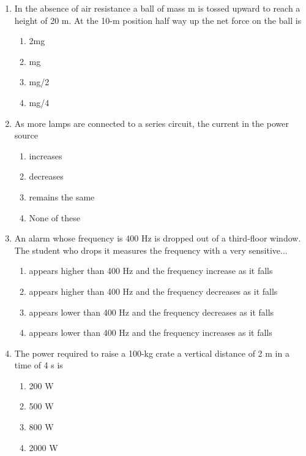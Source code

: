 \documentclass[12pt]{article}
\begin{document}
\begin{enumerate}[label=\arabic*.]
\begin{enumerate}[label=(\alph*)]
    \item frequency does not change, the wavelength decreases, and the speed decreases
    \item frequency does not change, the wavelength increases, and the speed decreases
\end{enumerate}
\item In the absence of air resistance a ball of mass m is tossed upward to reach a height of 20 m. At the 10-m position half way up the net force on the ball is
\begin{enumerate}[label=(\alph*)]
    \item 2mg
    \item mg
    \item mg/2
    \item mg/4
\end{enumerate}
\item As more lamps are connected to a series circuit, the current in the power source
\begin{enumerate}[label=(\alph*)]
    \item increases
    \item decreases
    \item remains the same
    \item None of these
\end{enumerate}
\item An alarm whose frequency is 400 Hz is dropped out of a third-floor window. The student who drops it measures the frequency with a very sensitive...
\begin{enumerate}[label=(\alph*)]
    \item appears higher than 400 Hz and the frequency increase as it falls
    \item appears higher than 400 Hz and the frequency decreases as it falls
    \item appears lower than 400 Hz and the frequency decreases as it falls
    \item appears lower than 400 Hz and the frequency increases as it falls
\end{enumerate}
\item The power required to raise a 100-kg crate a vertical distance of 2 m in a time of 4 s is
\begin{enumerate}[label=(\alph*)]
    \item 200 W
    \item 500 W
    \item 800 W
    \item 2000 W
\end{enumerate}

\end{enumerate}
\end{document}
